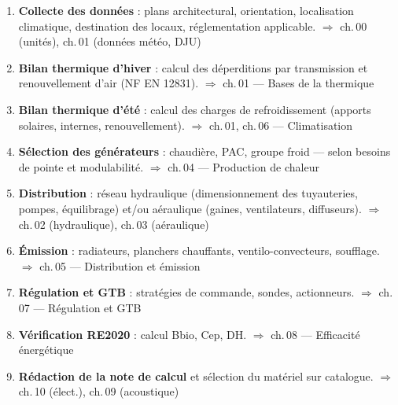 \begin{methode}[title={Étapes du dimensionnement CVC}]
  \begin{enumerate}
    \item \textbf{Collecte des données} : plans architectural, orientation, localisation climatique, destination des locaux, réglementation applicable.
          \hfill\textcolor{FedBlue!70!black}{\textsf{\footnotesize$\Rightarrow$ ch.\,00 (unités), ch.\,01 (données météo, DJU)}}
    \item \textbf{Bilan thermique d'hiver} : calcul des déperditions par transmission et renouvellement d'air (NF EN 12831).
          \hfill\textcolor{FedBlue!70!black}{\textsf{\footnotesize$\Rightarrow$ ch.\,01 — Bases de la thermique}}
    \item \textbf{Bilan thermique d'été} : calcul des charges de refroidissement (apports solaires, internes, renouvellement).
          \hfill\textcolor{FedBlue!70!black}{\textsf{\footnotesize$\Rightarrow$ ch.\,01, ch.\,06 — Climatisation}}
    \item \textbf{Sélection des générateurs} : chaudière, PAC, groupe froid — selon besoins de pointe et modulabilité.
          \hfill\textcolor{FedBlue!70!black}{\textsf{\footnotesize$\Rightarrow$ ch.\,04 — Production de chaleur}}
    \item \textbf{Distribution} : réseau hydraulique (dimensionnement des tuyauteries, pompes, équilibrage) et/ou aéraulique (gaines, ventilateurs, diffuseurs).
          \hfill\textcolor{FedBlue!70!black}{\textsf{\footnotesize$\Rightarrow$ ch.\,02 (hydraulique), ch.\,03 (aéraulique)}}
    \item \textbf{Émission} : radiateurs, planchers chauffants, ventilo-convecteurs, soufflage.
          \hfill\textcolor{FedBlue!70!black}{\textsf{\footnotesize$\Rightarrow$ ch.\,05 — Distribution et émission}}
    \item \textbf{Régulation et GTB} : stratégies de commande, sondes, actionneurs.
          \hfill\textcolor{FedBlue!70!black}{\textsf{\footnotesize$\Rightarrow$ ch.\,07 — Régulation et GTB}}
    \item \textbf{Vérification RE2020} : calcul Bbio, Cep, DH.
          \hfill\textcolor{FedBlue!70!black}{\textsf{\footnotesize$\Rightarrow$ ch.\,08 — Efficacité énergétique}}
    \item \textbf{Rédaction de la note de calcul} et sélection du matériel sur catalogue.
          \hfill\textcolor{FedBlue!70!black}{\textsf{\footnotesize$\Rightarrow$ ch.\,10 (élect.), ch.\,09 (acoustique)}}
  \end{enumerate}
\end{methode}

